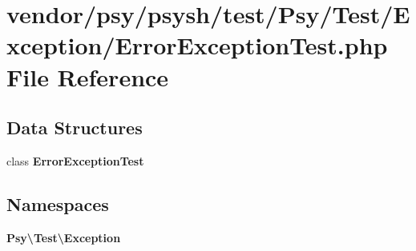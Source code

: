 \section{vendor/psy/psysh/test/\+Psy/\+Test/\+Exception/\+Error\+Exception\+Test.php File Reference}
\label{_error_exception_test_8php}
\subsection*{Data Structures}
\begin{DoxyCompactItemize}
\item 
class {\bf Error\+Exception\+Test}
\end{DoxyCompactItemize}
\subsection*{Namespaces}
\begin{DoxyCompactItemize}
\item 
 {\bf Psy\textbackslash{}\+Test\textbackslash{}\+Exception}
\end{DoxyCompactItemize}
